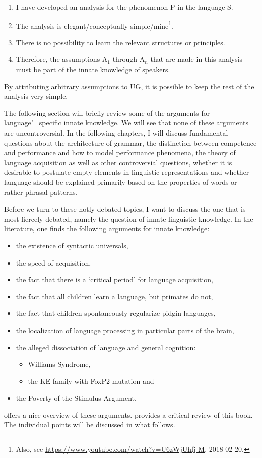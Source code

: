 \begin{enumerate}
\item I have developed an analysis for the phenomenon P in the language S.
\item The analysis is elegant/conceptually simple/mine\footnote{%
    Also, see
    \url{https://www.youtube.com/watch?v=U6zWjUhfj-M}. 2018-02-20.\nocite{Zappa86a}
}.
\item There is no possibility to learn the relevant structures or principles.
\item Therefore, the assumptions A$_1$ through A$_n$ that are made in this analysis must be part of the innate knowledge
of speakers.
\end{enumerate}
By attributing arbitrary assumptions to UG, it is possible to keep the rest of the analysis very
simple.

The following section will briefly review some of the arguments for language"=specific innate knowledge.
We will see that none of these arguments are uncontroversial. In the following chapters, I will discuss fundamental
questions about the architecture of grammar, the distinction between competence and performance and how to model
performance phenomena, the theory of language acquisition as well as other controversial questions, \eg 
whether it is desirable to postulate empty elements in linguistic representations and whether language should
be explained primarily based on the properties of words or rather phrasal patterns.

Before we turn to these hotly debated topics, I want to discuss the one that is most fiercely
debated, namely the question of innate linguistic knowledge. In the literature, one finds the
following arguments for innate knowledge:

\begin{itemize}
\item the existence of syntactic universals,
\item the speed of acquisition,
\item the fact that there is a `critical period' for language acquisition,
\item the fact that all children learn a language, but primates do not,
\item the fact that children spontaneously regularize pidgin languages, 
\item the localization of language processing in particular parts of the brain,
\item the alleged dissociation of language and general cognition:
\begin{itemize}
\item Williams Syndrome,
\item the KE family with FoxP2 mutation and
\end{itemize}
\item the Poverty of the Stimulus Argument.
\end{itemize}
\citet{Pinker94a} offers a nice overview of these arguments. \citet{Tomasello95a} provides a critical review of this book. The individual points will be discussed in what follows.

